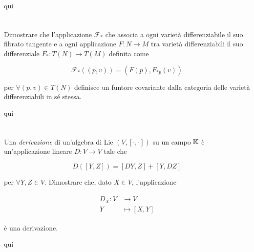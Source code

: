 qui

\tocless\section{}\label{es2-27}

\begin{tcolorbox}
	Dimostrare che l'applicazione $ \mathcal{F}_{*} $ che associa a ogni varietà differenziabile il suo fibrato tangente e a ogni applicazione $ F : N \to M $ tra varietà differenziabili il suo differenziale $ F_{*} : T(N) \to T(M) $ definita come
	
	\begin{equation}
		\mathcal{F}_{*}((p,v)) = (F(p), F_{*p}(v))
	\end{equation}

	per $ \forall (p,v) \in T(N) $ definisce un funtore covariante dalla categoria delle varietà differenziabili in sé stessa.
\end{tcolorbox}

qui

\tocless\section{}\label{es2-28}

\begin{tcolorbox}
	Una \textit{derivazione} di un'algebra di Lie $ (V,[\cdot,\cdot]) $ su un campo $ \mathbb{K} $ è un'applicazione lineare $ D : V \to V $ tale che
	
	\begin{equation}
		D([Y,Z]) = [DY,Z] + [Y,DZ]
	\end{equation}

	per $ \forall Y,Z \in V $. Dimostrare che, dato $ X \in V $, l'applicazione
	
	\begin{align}
		\begin{split}
			D_{X} : V &\to V\\
			Y &\mapsto [X,Y]
		\end{split}
	\end{align}

	è una derivazione.
\end{tcolorbox}

qui

\tocless\section{}\label{es2-29}

